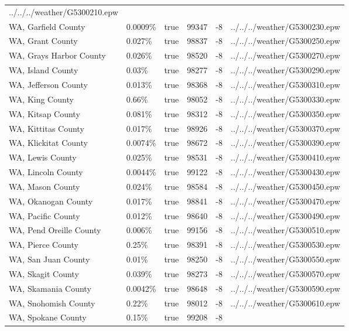 \begin{longtable}[]{@{}llllll@{}}
../../../weather/G5300210.epw \\
WA, Garfield County & 0.0009\% & true & 99347 & -8 &
../../../weather/G5300230.epw \\
WA, Grant County & 0.027\% & true & 98837 & -8 &
../../../weather/G5300250.epw \\
WA, Grays Harbor County & 0.026\% & true & 98520 & -8 &
../../../weather/G5300270.epw \\
WA, Island County & 0.03\% & true & 98277 & -8 &
../../../weather/G5300290.epw \\
WA, Jefferson County & 0.013\% & true & 98368 & -8 &
../../../weather/G5300310.epw \\
WA, King County & 0.66\% & true & 98052 & -8 &
../../../weather/G5300330.epw \\
WA, Kitsap County & 0.081\% & true & 98312 & -8 &
../../../weather/G5300350.epw \\
WA, Kittitas County & 0.017\% & true & 98926 & -8 &
../../../weather/G5300370.epw \\
WA, Klickitat County & 0.0074\% & true & 98672 & -8 &
../../../weather/G5300390.epw \\
WA, Lewis County & 0.025\% & true & 98531 & -8 &
../../../weather/G5300410.epw \\
WA, Lincoln County & 0.0044\% & true & 99122 & -8 &
../../../weather/G5300430.epw \\
WA, Mason County & 0.024\% & true & 98584 & -8 &
../../../weather/G5300450.epw \\
WA, Okanogan County & 0.017\% & true & 98841 & -8 &
../../../weather/G5300470.epw \\
WA, Pacific County & 0.012\% & true & 98640 & -8 &
../../../weather/G5300490.epw \\
WA, Pend Oreille County & 0.006\% & true & 99156 & -8 &
../../../weather/G5300510.epw \\
WA, Pierce County & 0.25\% & true & 98391 & -8 &
../../../weather/G5300530.epw \\
WA, San Juan County & 0.01\% & true & 98250 & -8 &
../../../weather/G5300550.epw \\
WA, Skagit County & 0.039\% & true & 98273 & -8 &
../../../weather/G5300570.epw \\
WA, Skamania County & 0.0042\% & true & 98648 & -8 &
../../../weather/G5300590.epw \\
WA, Snohomish County & 0.22\% & true & 98012 & -8 &
../../../weather/G5300610.epw \\
WA, Spokane County & 0.15\% & true & 99208 & -8 &

\end{longtable}
